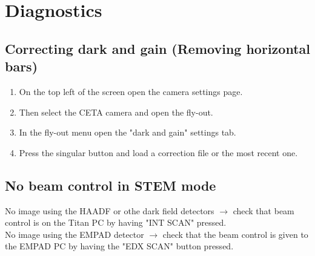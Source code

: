 \documentclass[a4paper]{scrartcl}
\begin{document}
\section*{Diagnostics}
\subsection*{Correcting dark and gain (Removing horizontal bars)}
\begin{enumerate}
	\item On the top left of the screen open the camera settings page.
	\item Then select the CETA camera and open the fly-out.
	\item In the fly-out menu open the "dark and gain" settings tab.
	\item Press the singular button and load a correction file or the most recent one.
\end{enumerate}

\subsection*{No beam control in STEM mode}
No image using the HAADF or othe dark field detectors $\rightarrow$ check that beam control is on the Titan PC by having "INT SCAN" pressed.\\
No image using the EMPAD detector $\rightarrow$ check that the beam control is given to the EMPAD PC by having the "EDX SCAN" button pressed.\\
\end{document}
